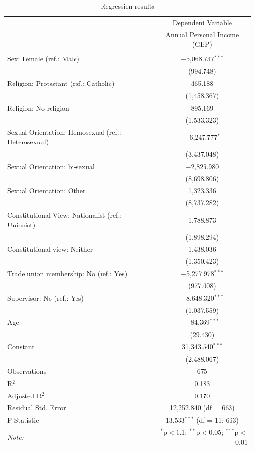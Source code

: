\documentclass[
]{article}
\begin{document}
\begin{table}[H] \centering 
  \caption{Regression results} 
  \label{} 
\small 
\begin{tabular}{@{\hspace{5pt}}l@{\hspace{5pt}}c} 
\toprule 
 & \multicolumn{1}{c}{Dependent Variable} \\ 
\cmidrule(rr){2-2} 
 & Annual Personal Income (GBP) \\ 
\midrule  
\\[-2.1ex] Sex: Female (ref.: Male) & $-$5,068.737$^{***}$ \\ 
  & (994.748) \\ 
 \addlinespace 
 Religion: Protestant (ref.: Catholic) & 465.188 \\ 
  & (1,458.367) \\ 
 \addlinespace 
 Religion: No religion & 895.169 \\ 
  & (1,533.323) \\ 
 \addlinespace 
 Sexual Orientation: Homosexual (ref.: Heterosexual) & $-$6,247.777$^{*}$ \\ 
  & (3,437.048) \\ 
 \addlinespace 
 Sexual Orientation: bi-sexual & $-$2,826.980 \\ 
  & (8,698.806) \\ 
 \addlinespace 
 Sexual Orientation: Other & 1,323.336 \\ 
  & (8,737.282) \\ 
 \addlinespace 
 Constitutional View: Nationalist (ref.: Unionist) & 1,788.873 \\ 
  & (1,898.294) \\ 
 \addlinespace 
 Constitutional view: Neither & 1,438.036 \\ 
  & (1,350.423) \\ 
 \addlinespace 
 Trade union membership: No (ref.: Yes) & $-$5,277.978$^{***}$ \\ 
  & (977.008) \\ 
 \addlinespace 
 Supervisor: No (ref.: Yes) & $-$8,648.320$^{***}$ \\ 
  & (1,037.559) \\ 
 \addlinespace 
 Age & $-$84.369$^{***}$ \\ 
  & (29.430) \\ 
 \addlinespace 
 Constant & 31,343.540$^{***}$ \\ 
  & (2,488.067) \\ 
 \addlinespace 
\midrule  
Observations & 675 \\ 
R$^{2}$ & 0.183 \\ 
Adjusted R$^{2}$ & 0.170 \\ 
Residual Std. Error & 12,252.840 (df = 663) \\ 
F Statistic & 13.533$^{***}$ (df = 11; 663) \\ 
\bottomrule 
\textit{Note:}  & \multicolumn{1}{r}{$^{*}$p$<$0.1; $^{**}$p$<$0.05; $^{***}$p$<$0.01} \\ 
\end{tabular} 
\end{table}
\end{document}
